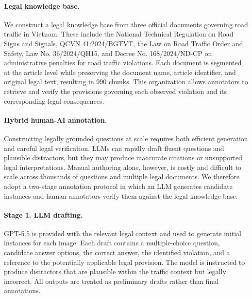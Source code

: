 \paragraph{Legal knowledge base.}
We construct a legal knowledge base from three official documents governing road traffic in Vietnam. These include the National Technical Regulation on Road Signs and Signals, QCVN 41:2024/BGTVT, the Law on Road Traffic Order and Safety, Law No. 36/2024/QH15, and Decree No. 168/2024/ND-CP on administrative penalties for road traffic violations. Each document is segmented at the article level while preserving the document name, article identifier, and original legal text, resulting in 990 chunks. This organization allows annotators to retrieve and verify the provisions governing each observed violation and its corresponding legal consequences.

\paragraph{Hybrid human-AI annotation.}
Constructing legally grounded questions at scale requires both efficient generation and careful legal verification. LLMs can rapidly draft fluent questions and plausible distractors, but they may produce inaccurate citations or unsupported legal interpretations. Manual authoring alone, however, is costly and difficult to scale across thousands of questions and multiple legal documents. We therefore adopt a two-stage annotation protocol in which an LLM generates candidate instances and human annotators verify them against the legal knowledge base.
\paragraph{Stage 1. LLM drafting.}
GPT-5.5 is provided with the relevant legal context and used to generate initial instances for each image. Each draft contains a multiple-choice question, candidate answer options, the correct answer, the identified violation, and a reference to the potentially applicable legal provision. The model is instructed to produce distractors that are plausible within the traffic context but legally incorrect. All outputs are treated as preliminary drafts rather than final annotations.
